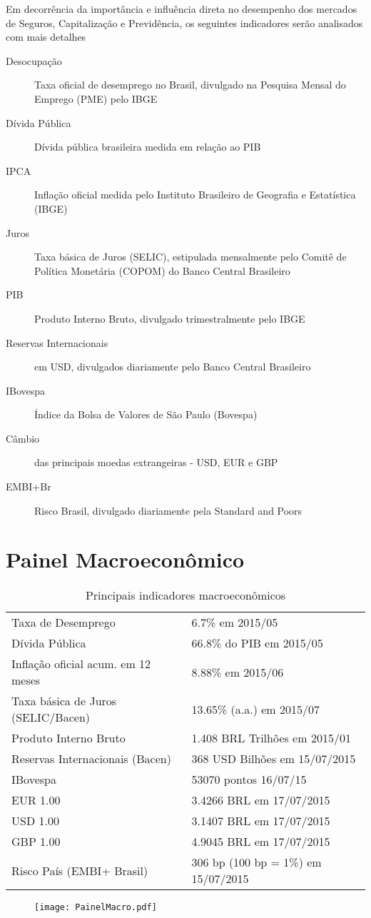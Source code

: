 \documentclass[../../relatorio.tex]{subfiles}
\begin{document}
Em decorrência da importância e influência direta no desempenho dos mercados de Seguros, Capitalização e Previdência, os seguintes indicadores serão analisados com mais detalhes
\begin{description}
  \item[Desocupação] Taxa oficial de desemprego no Brasil, divulgado na Pesquisa Mensal do Emprego (PME) pelo IBGE
  \item[Dívida Pública] Dívida pública brasileira medida em relação ao PIB
  \item[IPCA] Inflação oficial medida pelo Instituto Brasileiro de Geografia e Estatística (IBGE)
  \item[Juros] Taxa básica de Juros (SELIC), estipulada mensalmente pelo Comitê de Política Monetária (COPOM) do Banco Central Brasileiro
  \item[PIB] Produto Interno Bruto, divulgado trimestralmente pelo IBGE
  \item[Reservas Internacionais] em USD, divulgados diariamente pelo Banco Central Brasileiro
  \item[IBovespa] Índice da Bolsa de Valores de São Paulo (Bovespa)
  \item[Câmbio] das principais moedas extrangeiras - USD, EUR e GBP
  \item[EMBI+Br] Risco Brasil, divulgado diariamente pela Standard and Poors
  \end{description}

\section{Painel Macroeconômico}

\begin{table}[ht]
\centering
\begin{tabular}{ll}
   \hline
Taxa de Desemprego & 6.7\% em 2015/05 \\ 
  Dívida Pública & 66.8\% do PIB em 2015/05 \\ 
  Inflação oficial acum. em 12 meses & 8.88\% em 2015/06 \\ 
  Taxa básica de Juros (SELIC/Bacen) & 13.65\% (a.a.) em 2015/07 \\ 
  Produto Interno Bruto & 1.408 BRL Trilhões em 2015/01 \\ 
  Reservas Internacionais (Bacen) & 368 USD Bilhões em 15/07/2015 \\ 
  IBovespa & 53070 pontos 16/07/15 \\ 
  EUR 1.00 & 3.4266 BRL em 17/07/2015 \\ 
  USD 1.00 & 3.1407 BRL em 17/07/2015 \\ 
  GBP 1.00 & 4.9045 BRL em 17/07/2015 \\ 
  Risco País (EMBI+ Brasil) & 306 bp (100 bp = 1\%) em 15/07/2015 \\ 
   \hline
\end{tabular}
\caption{Principais indicadores macroeconômicos} 
\end{table}
\pagebreak

\begin{figure}[ht]
  \begin{minipage}{0.70\textheight}
    \centering
      \texttt{[image: PainelMacro.pdf]}
  \end{minipage}
\end{figure}
\end{document}
